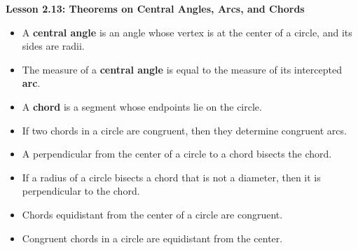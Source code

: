 \begin{center}
\textbf{Lesson 2.13: Theorems on Central Angles, Arcs, and Chords}
\end{center}

\vspace*{-1.5ex}

\begin{itemize}
    \item A \textbf{central angle} is an angle whose vertex is at the center of a circle, and its sides are radii.
    \item The measure of a \textbf{central angle} is equal to the measure of its intercepted \textbf{arc}.
    \item A \textbf{chord} is a segment whose endpoints lie on the circle.
    \item If two chords in a circle are congruent, then they determine congruent arcs.
    \item A perpendicular from the center of a circle to a chord bisects the chord.
    \item If a radius of a circle bisects a chord that is not a diameter, then it is perpendicular to the chord.
    \item Chords equidistant from the center of a circle are congruent.
    \item Congruent chords in a circle are equidistant from the center.
\end{itemize}
